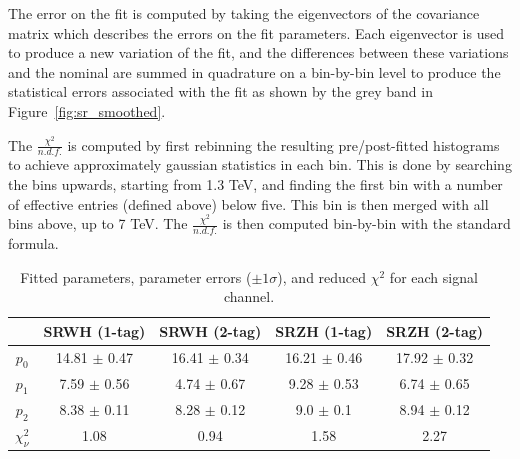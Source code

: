 The error on the fit is computed by taking the eigenvectors of the covariance matrix which describes the errors on the fit parameters.
Each eigenvector is used to produce a new variation of the fit, and the differences between these variations and the nominal are summed in quadrature on a bin-by-bin level to produce the statistical errors associated with the fit as shown by the grey band in Figure~\ref{fig:sr_smoothed}.

The $\frac{\chi^2}{n.d.f.}$ is computed by first rebinning the resulting pre/post-fitted histograms to achieve approximately gaussian statistics in each bin.
This is done by searching the bins upwards, starting from 1.3 TeV, and finding the first bin with a number of effective entries (defined above) below five.
This bin is then merged with all bins above, up to 7 TeV.
The $\frac{\chi^2}{n.d.f.}$ is then computed bin-by-bin with the standard formula.

\begin{table}[!htb]
\begin{center}
\begin{tabular}{|c|c|c|c|c|}
\hline
 & SRWH (1-tag) & SRWH (2-tag) & SRZH (1-tag) & SRZH (2-tag) \\ \hline
    $p_0$ & 14.81 $\pm$ 0.47 & 16.41 $\pm$ 0.34 & 16.21 $\pm$ 0.46 & 17.92 $\pm$ 0.32 \\
\hline
    $p_1$ & 7.59 $\pm$ 0.56 & 4.74 $\pm$ 0.67 & 9.28 $\pm$ 0.53 & 6.74 $\pm$ 0.65 \\
\hline
    $p_2$ & 8.38 $\pm$ 0.11 & 8.28 $\pm$ 0.12 & 9.0 $\pm$ 0.1 & 8.94 $\pm$ 0.12 \\
\hline
    $\chi_{\nu}^2$ & 1.08 & 0.94 & 1.58 & 2.27 \\
\hline
\end{tabular}
\caption{Fitted parameters, parameter errors ($\pm 1 \sigma$), and reduced $\chi^2$ for each signal channel.}
\label{tab:fit_params}
\end{center}
\end{table}

